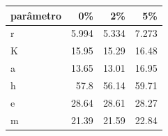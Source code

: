 \begin{tabular}{lrrr}
\toprule
parâmetro & 0\% & 2\% & 5\% \\
\midrule
r & 5.994 & 5.334 & 7.273 \\
K & 15.95 & 15.29 & 16.48 \\
a & 13.65 & 13.01 & 16.95 \\
h & 57.8 & 56.14 & 59.71 \\
e & 28.64 & 28.61 & 28.27 \\
m & 21.39 & 21.59 & 22.84 \\
\bottomrule
\end{tabular}

